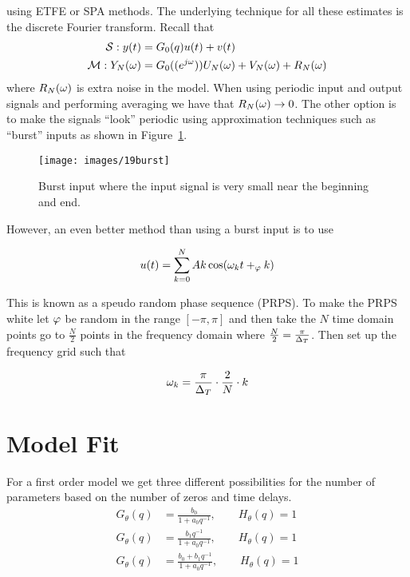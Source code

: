 using ETFE or SPA methods.
The underlying technique for all these estimates is the discrete Fourier transform.
Recall that
\begin{align*}
\mathcal{S}: y(t) &= G_0(q)u(t) + v(t) \\
\mathcal{M}: Y_N(\omega) &= G_0((e^{j\omega}))U_N(\omega) + V_N(\omega) + R_N(\omega)
\end{align*}
where $R_N(\omega)$ is extra noise in the model.
When using periodic input and output signals and performing averaging we have that $R_N(\omega)\to0$.
The other option is to make the signals ``look'' periodic using approximation techniques such as ``burst'' inputs as shown in Figure~\ref{fig:19burst}.

\begin{figure}[ht!]
\centering
\texttt{[image: images/19burst]}
\caption{Burst input where the input signal is very small near the beginning and end.}%
\label{fig:19burst}
\end{figure}

However, an even better method than using a burst input is to use

\begin{equation*}
u(t) = \sum_{k=0}^N Ak\cos(\omega_k t+_\varphi k)
\end{equation*}

This is known as a speudo random phase sequence (PRPS).
To make the PRPS white let $\varphi$ be random in the range $[-\pi,\pi]$ and then take the $N$ time domain points go to $\frac{N}{2}$ points in the frequency domain where $\frac{N}{2}=\frac{\pi}{\Delta_T}$.
Then set up the frequency grid such that

\begin{equation*}
\omega_k = \frac{\pi}{\Delta_T}\cdot\frac{2}{N}\cdot k
\end{equation*}

\section{Model Fit}
For a first order model we get three different possibilities for the number of parameters based on the number of zeros and time delays.
\begin{align*}
G_\theta(q) &= \frac{b_0}{1+a_0q^{-1}}, \qquad H_\theta(q) = 1 \\
G_\theta(q) &= \frac{b_1q^{-1}}{1+a_0q^{-1}}, \qquad H_\theta(q) = 1 \\
G_\theta(q) &= \frac{b_0+b_1q^{-1}}{1+a_0q^{-1}}, \qquad H_\theta(q) = 1
\end{align*}

